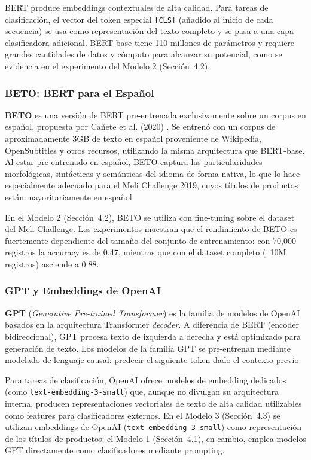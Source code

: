 \documentclass[11pt,a4paper]{article}
\begin{document}
BERT produce embeddings contextuales de alta calidad. Para tareas de clasificación, el vector del token especial \texttt{[CLS]} (añadido al inicio de cada secuencia) se usa como representación del texto completo y se pasa a una capa clasificadora adicional. BERT-base tiene 110 millones de parámetros y requiere grandes cantidades de datos y cómputo para alcanzar su potencial, como se evidencia en el experimento del Modelo 2 (Sección~4.2).

\subsubsection{BETO: BERT para el Español}

\textbf{BETO} es una versión de BERT pre-entrenada exclusivamente sobre un corpus en español, propuesta por Cañete et al. (2020) \cite{canete2020}. Se entrenó con un corpus de aproximadamente 3GB de texto en español proveniente de Wikipedia, OpenSubtitles y otros recursos, utilizando la misma arquitectura que BERT-base. Al estar pre-entrenado en español, BETO captura las particularidades morfológicas, sintácticas y semánticas del idioma de forma nativa, lo que lo hace especialmente adecuado para el Meli Challenge 2019, cuyos títulos de productos están mayoritariamente en español.

En el Modelo 2 (Sección~4.2), BETO se utiliza con fine-tuning sobre el dataset del Meli Challenge. Los experimentos muestran que el rendimiento de BETO es fuertemente dependiente del tamaño del conjunto de entrenamiento: con 70,000 registros la accuracy es de 0.47, mientras que con el dataset completo (~10M registros) asciende a 0.88.

\subsubsection{GPT y Embeddings de OpenAI}

\textbf{GPT} (\textit{Generative Pre-trained Transformer}) es la familia de modelos de OpenAI basados en la arquitectura Transformer \emph{decoder}. A diferencia de BERT (encoder bidireccional), GPT procesa texto de izquierda a derecha y está optimizado para generación de texto. Los modelos de la familia GPT se pre-entrenan mediante modelado de lenguaje causal: predecir el siguiente token dado el contexto previo.

Para tareas de clasificación, OpenAI ofrece modelos de embedding dedicados (como \texttt{text-embedding-3-small}) que, aunque no divulgan su arquitectura interna, producen representaciones vectoriales de texto de alta calidad utilizables como features para clasificadores externos. En el Modelo 3 (Sección~4.3) se utilizan embeddings de OpenAI (\texttt{text-embedding-3-small}) como representación de los títulos de productos; el Modelo 1 (Sección~4.1), en cambio, emplea modelos GPT directamente como clasificadores mediante prompting.
\end{document}
